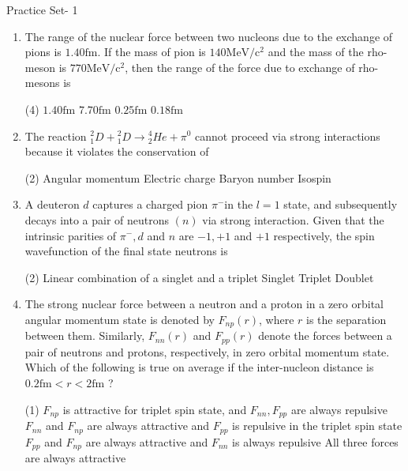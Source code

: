 \newpage
\begin{abox}
	Practice Set- 1
	\end{abox}
\begin{enumerate}
	\item The range of the nuclear force between two nucleons due to the exchange of pions is $1.40 \mathrm{fm}$. If the mass of pion is $140 \mathrm{MeV} / \mathrm{c}^{2}$ and the mass of the rho-meson is $770 \mathrm{MeV} / \mathrm{c}^{2}$, then the range of the force due to exchange of rho-mesons is
{}
\begin{tasks}(4)
	\task[\textbf{A.}] $1.40 \mathrm{fm}$
	\task[\textbf{B.}]$7.70 \mathrm{fm}$
	\task[\textbf{C.}]$0.25 \mathrm{fm}$
	\task[\textbf{D.}]$0.18 \mathrm{fm}$
\end{tasks}
\item  The reaction ${ }_1^2 D+{ }_1^2 D \rightarrow{ }_2^4 H e+\pi^0$ cannot proceed via strong interactions because it violates the conservation of
{}
 \begin{tasks}(2)
	\task[\textbf{a.}]Angular momentum
	\task[\textbf{b.}]Electric charge
	\task[\textbf{c.}]Baryon number
	\task[\textbf{d.}]Isospin 
\end{tasks}
\item  A deuteron $d$ captures a charged pion $\pi^{-}$in the $l=1$ state, and subsequently decays into a pair of neutrons $(n)$ via strong interaction. Given that the intrinsic parities of $\pi^{-}, d$ and $n$ are $-1,+1$ and $+1$ respectively, the spin wavefunction of the final state neutrons is
{}
 \begin{tasks}(2)
	\task[\textbf{a.}]Linear combination of a singlet and a triplet
	\task[\textbf{b.}]Singlet
	\task[\textbf{c.}]Triplet
	\task[\textbf{d.}]Doublet 
\end{tasks}
\item  The strong nuclear force between a neutron and a proton in a zero orbital angular momentum state is denoted by $F_{n p}(r)$, where $r$ is the separation between them. Similarly, $F_{n n}(r)$ and $F_{p p}(r)$ denote the forces between a pair of neutrons and protons, respectively, in zero orbital momentum state. Which of the following is true on average if the inter-nucleon distance is $0.2 \mathrm{fm}<r<2 \mathrm{fm}$ ?
 \begin{tasks}(1)
	\task[\textbf{a.}]$F_{n p}$ is attractive for triplet spin state, and $F_{n n}, F_{p p}$ are always repulsive
	\task[\textbf{b.}]$F_{n n}$ and $F_{n p}$ are always attractive and $F_{p p}$ is repulsive in the triplet spin state
	\task[\textbf{c.}]$F_{p p}$ and $F_{n p}$ are always attractive and $F_{n n}$ is always repulsive
	\task[\textbf{d.}]All three forces are always attractive 
\end{tasks}
\end{enumerate}
